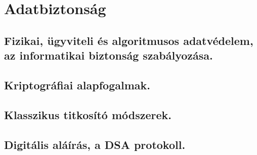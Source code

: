 \section{Adatbiztonság}
\subsection{Fizikai, ügyviteli és algoritmusos adatvédelem, az informatikai biztonság szabályozása.}

\subsection{Kriptográfiai alapfogalmak.}

\subsection{Klasszikus titkosító módszerek.}

\subsection{Digitális aláírás, a DSA protokoll.}
